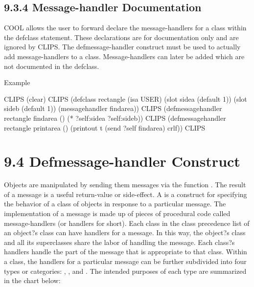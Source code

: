 \documentclass[letterpaper,10pt,english]{sphinxmanual}
\begin{document}
\subsection{9.3.4 Message-handler Documentation}
\label{\detokenize{cool:message-handler-documentation}}
COOL allows the user to forward declare the message-handlers for a class
within the defclass statement. These declarations are for documentation
only and are ignored by CLIPS. The defmessage-handler construct must be
used to actually add message-handlers to a class. Message-handlers can
later be added which are not documented in the defclass.

Example

\begin{sphinxVerbatim}[commandchars=\\\{\}]
CLIPS\PYGZgt{} (clear)
CLIPS\PYGZgt{}
(defclass rectangle (is\PYGZhy{}a USER)
  (slot side\PYGZhy{}a (default 1))
  (slot side\PYGZhy{}b (default 1))
  (message\PYGZhy{}handler find\PYGZhy{}area))
CLIPS\PYGZgt{}
(defmessage\PYGZhy{}handler rectangle find\PYGZhy{}area ()
  (* ?self:side\PYGZhy{}a ?self:side\PYGZhy{}b))
CLIPS\PYGZgt{}
(defmessage\PYGZhy{}handler rectangle print\PYGZhy{}area ()
  (printout t (send ?self find\PYGZhy{}area) crlf))
CLIPS\PYGZgt{}
\end{sphinxVerbatim}


\section{9.4 Defmessage-handler Construct}
\label{\detokenize{cool:defmessage-handler-construct}}
Objects are manipulated by sending them messages via the function
. The result of a message is a useful return-value or
side-effect. A  is a construct for specifying the
behavior of a class of objects in response to a particular message. The
implementation of a message is made up of pieces of procedural code
called message-handlers (or handlers for short). Each class in the class
precedence list of an object?s class can have handlers for a message. In
this way, the object?s class and all its superclasses share the labor of
handling the message. Each class?s handlers handle the part of the
message that is appropriate to that class. Within a class, the handlers
for a particular message can be further subdivided into four types or
categories: , ,  and . The
intended purposes of each type are summarized in the chart below:
\end{document}
